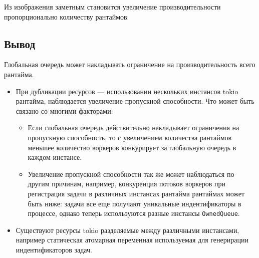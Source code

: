 Из изображения заметным становится увеличение производительности пропорционально количеству рантаймов.

\subsection{Вывод}

Глобальная очередь может накладывать ограничение на производительность всего рантайма.

\begin{itemize}
    \item При дубликации ресурсов --- использовании нескольких инстансов tokio рантайма, наблюдается увеличение пропускной способности. Что может быть связано со многими факторами:
    \begin{itemize}
        \item Если глобальная очередь действительно накладывает ограничения на пропускную способность, то с увеличением количества рантаймов меньшее количество воркеров конкурирует за глобальную очередь в каждом инстансе.
        \item Увеличение пропускной способности так же может наблюдаться по другим причинам, например, конкуренция потоков воркеров при регистрация задачи в различных инстансах рантайма рантаймах может быть ниже: задачи все еще получают уникальные индентификаторы в процессе, однако теперь используются разные инстансы \verb|OwnedQueue|.
    \end{itemize}
    \item Существуют ресурсы tokio разделяемые между различными инстансами, например статическая атомарная переменная используемая для генерирации индентификаторов задач.
\end{itemize}
